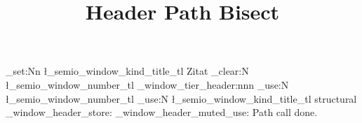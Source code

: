 \documentclass[type=zwischenbericht]{zukunftbau}
\title{Header Path Bisect}
\begin{document}
\ExplSyntaxOn
\tl_set:Nn \l_semio_window_kind_title_tl { Zitat }
\tl_clear:N \l_semio_window_number_tl
\semio_window_tier_header:nnn
  { \tl_use:N \l_semio_window_number_tl }
  { \tl_use:N \l_semio_window_kind_title_tl }
  { structural }
\semio_window_header_store:
\semio_window_header_muted_use:
\ExplSyntaxOff
Path call done.
\end{document}
